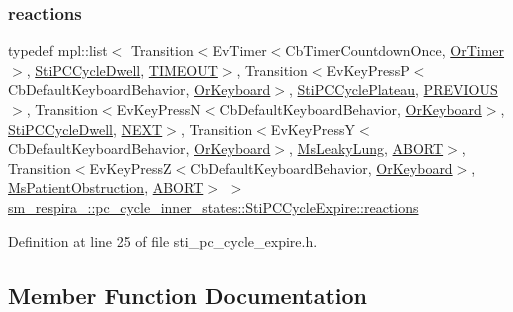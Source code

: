 \subsubsection{\texorpdfstring{reactions}{reactions}}
{\footnotesize\ttfamily typedef mpl\+::list$<$ Transition$<$Ev\+Timer$<$Cb\+Timer\+Countdown\+Once, \hyperlink{classsm__respira__1_1_1OrTimer}{Or\+Timer}$>$, \hyperlink{structsm__respira__1_1_1pc__cycle__inner__states_1_1StiPCCycleDwell}{Sti\+P\+C\+Cycle\+Dwell}, \hyperlink{structsm__respira__1_1_1pc__cycle__inner__states_1_1StiPCCycleExpire_1_1TIMEOUT}{T\+I\+M\+E\+O\+UT}$>$, Transition$<$Ev\+Key\+PressP$<$Cb\+Default\+Keyboard\+Behavior, \hyperlink{classsm__respira__1_1_1OrKeyboard}{Or\+Keyboard}$>$, \hyperlink{structsm__respira__1_1_1pc__cycle__inner__states_1_1StiPCCyclePlateau}{Sti\+P\+C\+Cycle\+Plateau}, \hyperlink{structsm__respira__1_1_1pc__cycle__inner__states_1_1StiPCCycleExpire_1_1PREVIOUS}{P\+R\+E\+V\+I\+O\+US}$>$, Transition$<$Ev\+Key\+PressN$<$Cb\+Default\+Keyboard\+Behavior, \hyperlink{classsm__respira__1_1_1OrKeyboard}{Or\+Keyboard}$>$, \hyperlink{structsm__respira__1_1_1pc__cycle__inner__states_1_1StiPCCycleDwell}{Sti\+P\+C\+Cycle\+Dwell}, \hyperlink{structsm__respira__1_1_1pc__cycle__inner__states_1_1StiPCCycleExpire_1_1NEXT}{N\+E\+XT}$>$, Transition$<$Ev\+Key\+PressY$<$Cb\+Default\+Keyboard\+Behavior, \hyperlink{classsm__respira__1_1_1OrKeyboard}{Or\+Keyboard}$>$, \hyperlink{classsm__respira__1_1_1MsLeakyLung}{Ms\+Leaky\+Lung}, \hyperlink{classABORT}{A\+B\+O\+RT}$>$, Transition$<$Ev\+Key\+PressZ$<$Cb\+Default\+Keyboard\+Behavior, \hyperlink{classsm__respira__1_1_1OrKeyboard}{Or\+Keyboard}$>$, \hyperlink{classsm__respira__1_1_1MsPatientObstruction}{Ms\+Patient\+Obstruction}, \hyperlink{classABORT}{A\+B\+O\+RT}$>$ $>$ \hyperlink{structsm__respira__1_1_1pc__cycle__inner__states_1_1StiPCCycleExpire_a54e6154636ad367cedb77d5fa782f4c4}{sm\+\_\+respira\+\_\+::pc\+\_\+cycle\+\_\+inner\+\_\+states\+::\+Sti\+P\+C\+Cycle\+Expire\+::reactions}}



Definition at line 25 of file sti\+\_\+pc\+\_\+cycle\+\_\+expire.\+h.



\subsection{Member Function Documentation}
\mbox{\label{structsm__respira__1_1_1pc__cycle__inner__states_1_1StiPCCycleExpire_ad5ee63b26397bf9c9b7388f01e2113a1}} 
